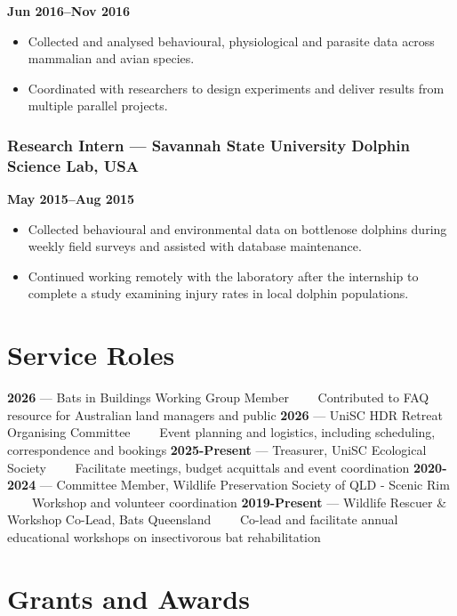 \documentclass[
]{article}
\providecommand{\tightlist}{%
  \setlength{\itemsep}{0pt}\setlength{\parskip}{0pt}}
\begin{document}
\textbf{Jun 2016--Nov 2016}

\begin{itemize}
\tightlist
\item
  Collected and analysed behavioural, physiological and parasite data
  across mammalian and avian species.
\item
  Coordinated with researchers to design experiments and deliver results
  from multiple parallel projects.
\end{itemize}

\subsubsection{Research Intern --- Savannah State University Dolphin
Science Lab,
USA}\label{research-intern-savannah-state-university-dolphin-science-lab-usa}

\textbf{May 2015--Aug 2015}

\begin{itemize}
\tightlist
\item
  Collected behavioural and environmental data on bottlenose dolphins
  during weekly field surveys and assisted with database maintenance.
\item
  Continued working remotely with the laboratory after the internship to
  complete a study examining injury rates in local dolphin populations.
\end{itemize}

\section{Service Roles}\label{service-roles}

\textbf{2026} --- Bats in Buildings Working Group Member ~~~~Contributed
to FAQ resource for Australian land managers and public \textbf{2026}
--- UniSC HDR Retreat Organising Committee ~~~~Event planning and
logistics, including scheduling, correspondence and bookings
\textbf{2025-Present} --- Treasurer, UniSC Ecological Society
~~~~Facilitate meetings, budget acquittals and event coordination
\textbf{2020-2024} --- Committee Member, Wildlife Preservation Society
of QLD - Scenic Rim ~~~~Workshop and volunteer coordination
\textbf{2019-Present} --- Wildlife Rescuer \& Workshop Co-Lead, Bats
Queensland ~~~~Co-lead and facilitate annual educational workshops on
insectivorous bat rehabilitation

\section{Grants and Awards}\label{grants-and-awards}
\end{document}
